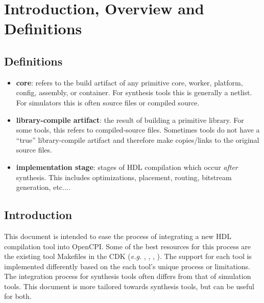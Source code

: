 \tableofcontents
\renewcommand\thesection{\Roman{section}}
\renewcommand\thesubsection{\thesection-\arabic{subsection}}

\newpage
\section{Introduction, Overview and Definitions}
\subsection{Definitions}
\begin{itemize}
\item \textbf{core}: refers to the build artifact of any primitive core, worker, platform, config, assembly, or container. For synthesis tools this is generally a netlist. For simulators this is often source files or compiled source.
\item \textbf{library-compile artifact}: the result of building a primitive library. For some tools, this refers to compiled-source files. Sometimes tools do not have a ``true'' library-compile artifact and therefore make copies/links to the original source files.
\item \textbf{implementation stage}: stages of HDL compilation which occur \textit{after} synthesis. This includes optimizations, placement, routing, bitstream generation, etc....
\end{itemize}

\subsection{Introduction}
This document is intended to ease the process of integrating a new HDL compilation tool into OpenCPI. Some of the best resources for this process are the existing tool Makefiles in the CDK (\textit{e.g.} , , , ). The support for each tool is implemented differently based on the each tool's unique process or limitations. The integration process for synthesis tools often differs from that of simulation tools. This document is more tailored towards synthesis tools, but can be useful for both.\newline

